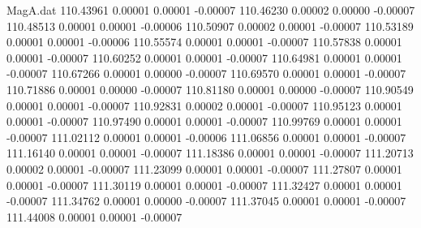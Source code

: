 \begin{filecontents}{MagA.dat}
 110.43961    0.00001    0.00001   -0.00007
 110.46230    0.00002    0.00000   -0.00007
 110.48513    0.00001    0.00001   -0.00006
 110.50907    0.00002    0.00001   -0.00007
 110.53189    0.00001    0.00001   -0.00006
 110.55574    0.00001    0.00001   -0.00007
 110.57838    0.00001    0.00001   -0.00007
 110.60252    0.00001    0.00001   -0.00007
 110.64981    0.00001    0.00001   -0.00007
 110.67266    0.00001    0.00000   -0.00007
 110.69570    0.00001    0.00001   -0.00007
 110.71886    0.00001    0.00000   -0.00007
 110.81180    0.00001    0.00000   -0.00007
 110.90549    0.00001    0.00001   -0.00007
 110.92831    0.00002    0.00001   -0.00007
 110.95123    0.00001    0.00001   -0.00007
 110.97490    0.00001    0.00001   -0.00007
 110.99769    0.00001    0.00001   -0.00007
 111.02112    0.00001    0.00001   -0.00006
 111.06856    0.00001    0.00001   -0.00007
 111.16140    0.00001    0.00001   -0.00007
 111.18386    0.00001    0.00001   -0.00007
 111.20713    0.00002    0.00001   -0.00007
 111.23099    0.00001    0.00001   -0.00007
 111.27807    0.00001    0.00001   -0.00007
 111.30119    0.00001    0.00001   -0.00007
 111.32427    0.00001    0.00001   -0.00007
 111.34762    0.00001    0.00000   -0.00007
 111.37045    0.00001    0.00001   -0.00007
 111.44008    0.00001    0.00001   -0.00007
\end{filecontents}
